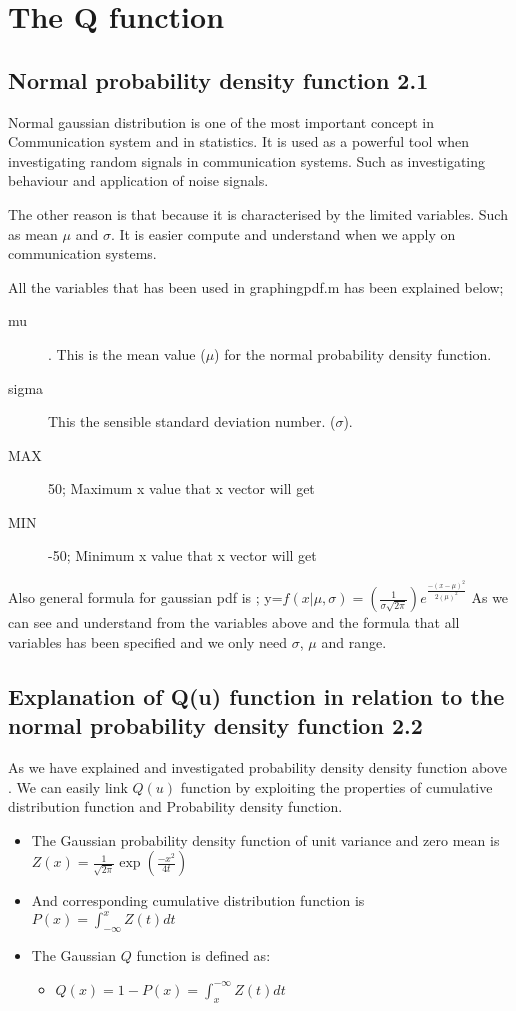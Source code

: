 \section{The Q function}

\subsection{Normal probability density function 2.1}
Normal gaussian distribution is one of the most important concept in Communication system and in statistics. It is used as a powerful tool when investigating random signals in communication systems.  Such as investigating behaviour and application of noise signals.

The other reason is that because it is characterised by the limited variables. Such as mean $\mu$ and $\sigma$. It is easier compute and understand when we apply on communication systems.

All the variables that has been used in graphingpdf.m has been explained below;

\begin{description}
	\item [mu] . This is the mean value ($\mu$) for the normal probability density function.
	\item [sigma] This the sensible standard deviation number. ($\sigma$).
	\item [MAX] 50; Maximum x value that x vector will get 
	\item [MIN] -50; Minimum x value that x vector will get
\end{description}

Also general formula for gaussian pdf is ;
y=$f(x|\mu,\sigma)=(\frac{1}{\sigma \sqrt{2 \pi}}) e^{\frac{-(x-\mu)^2}{2(\mu)^2}}$
As we can see and understand from the variables above and the formula that all variables has been specified and we only need $\sigma$, $\mu$ and range.

\subsection{Explanation of Q(u) function in relation to the normal probability density function 2.2 }
As we have explained and investigated probability density density function above . We can easily link $Q(u)$ function by exploiting the properties of cumulative distribution function and Probability density function.
\begin{itemize}
	\item The Gaussian probability density function of unit variance and zero mean is $Z(x)=\frac{1}{\sqrt{2\pi}} \exp(\frac{-x^2}{4t})$
	\item And corresponding cumulative distribution function is $P(x)=\int_{-\infty}^{x} Z(t) dt$
	\item The Gaussian $Q$ function is defined as:
		\begin{itemize}
			\item $ Q(x) = 1-P(x)=\int_{x}^{-\infty} Z(t) dt$
		\end{itemize}
\end{itemize}

